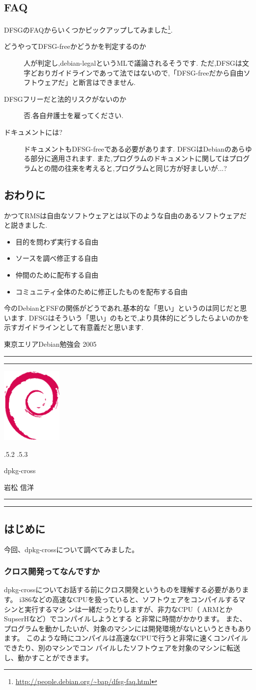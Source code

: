 \documentclass[mingoth]{jsarticle}
\makeatletter
\renewcommand{\section}{\@startsection{section}{1}{\z@}%
    {\Cvs \@plus.5\Cdp \@minus.2\Cdp}%
    {.5\Cvs \@plus.3\Cdp}%
    {\normalfont\Large\headfont\raggedright\centering}} %
\newcommand{\dancersection}[2]{%
\newpage
東京エリアDebian勉強会 2005
\hrule
\vspace{0.5mm}
\hrule
\hfill{}\includegraphics[width=3cm]{image200502/openlogo-nd.eps}\\
\vspace{-4cm}
\begin{center}
  \section{#1}
\end{center}
\hfill{}#2\hspace{3cm}\space\\
\hrule
\hrule
\vspace{1cm}
}
\makeatother
\begin{document}
\subsection{FAQ}
DFSGのFAQからいくつかピックアップしてみました\footnote{\url{http://people.debian.org/~bap/dfsg-faq.html}}.
\begin{description}
\item[どうやってDFSG-freeかどうかを判定するのか]
人が判定し,debian-legalというMLで議論されるそうです.
ただ,DFSGは文字どおりガイドラインであって法ではないので,「DFSG-freeだから自由ソフトウェアだ」と断言はできません.
\item[DFSGフリーだと法的リスクがないのか]
否.各自弁護士を雇ってください.
\item[ドキュメントには?]
ドキュメントもDFSG-freeである必要があります.
DFSGはDebianのあらゆる部分に適用されます.
また,プログラムのドキュメントに関してはプログラムとの間の往来を考えると,プログラムと同じ方が好ましいが...?
\end{description}

\subsection{おわりに}
かつてRMSは自由なソフトウェアとは以下のような自由のあるソフトウェアだと説きました.
\begin{itemize}
\item 目的を問わず実行する自由
\item ソースを調べ修正する自由
\item 仲間のために配布する自由
\item コミュニティ全体のために修正したものを配布する自由
\end{itemize}
今のDebianとFSFの関係がどうであれ,基本的な「思い」というのは同じだと思います.
DFSGはそういう「思い」のもとで,より具体的にどうしたらよいのかを示すガイドラインとして有意義だと思います.

\dancersection{dpkg-cross}{岩松 信洋}

\subsection{はじめに}
今回、dpkg-crossについて調べてみました。
\subsubsection{クロス開発ってなんですか}
dpkg-crossについてお話する前にクロス開発というものを理解する必要があります。
i386などの高速なCPUを扱っていると、ソフトウェアをコンパイルするマシンと実行するマシ
ンは一緒だったりしますが、非力なCPU（ ARMとかSupserHなど）でコンパイルしようとする
と非常に時間がかかります。
また、プログラムを動かしたいが、対象のマシンには開発環境がないというときもあります。
このような時にコンパイルは高速なCPUで行うと非常に速くコンパイルできたり、別のマシンでコン
パイルしたソフトウェアを対象のマシンに転送し、動かすことができます。
\end{document}
